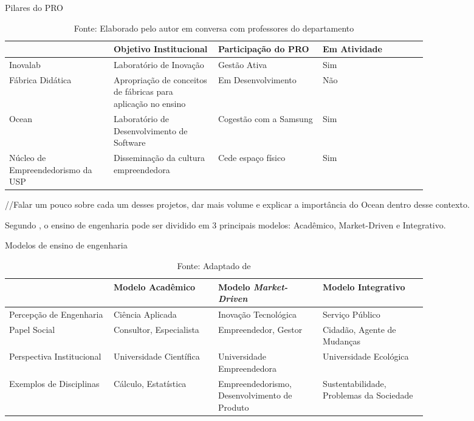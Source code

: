 \begin{table}[H]
\begin{center}
\caption{Pilares do PRO}
\label{tab:pilares_pro}
{\def\arraystretch{2}\tabcolsep=10pt
\begin{tabular}{>{\raggedright}p{0.2\linewidth}>{\raggedright\arraybackslash}p{0.2\linewidth}>{\raggedright\arraybackslash}p{0.2\linewidth}>{\raggedright\arraybackslash}p{0.2\linewidth}}
\hline
     & Objetivo Institucional & Participação do PRO & Em Atividade  \\ \hline
     Inovalab & Laboratório de Inovação & Gestão Ativa & Sim  \\
     Fábrica Didática & Apropriação de conceitos de fábricas para aplicação no ensino & Em Desenvolvimento & Não \\
     Ocean & Laboratório de Desenvolvimento de Software & Cogestão com a Samsung & Sim \\
	 Núcleo de Empreendedorismo da USP & Disseminação da cultura empreendedora & Cede espaço físico & Sim \\ \hline
\end{tabular}%
}
\caption* {Fonte: Elaborado pelo autor em conversa com professores do departamento}
\end{center}
\end{table}

//Falar um pouco sobre cada um desses projetos, dar mais volume e explicar a importância do Ocean dentro desse contexto. 


Segundo , o ensino de engenharia pode ser dividido em 3 principais modelos: Acadêmico, Market-Driven e Integrativo.

\begin{table}[H]
\begin{center}
\caption{Modelos de ensino de engenharia}
\label{tab:modelos_ensino_tab}
{\def\arraystretch{2}\tabcolsep=10pt
\begin{tabular}{>{\raggedright}p{0.2\linewidth}>{\raggedright\arraybackslash}p{0.2\linewidth}>{\raggedright\arraybackslash}p{0.2\linewidth}>{\raggedright\arraybackslash}p{0.2\linewidth}}
\hline
     & Modelo Acadêmico & Modelo \textit{Market-Driven} & Modelo Integrativo \\ \hline
     Percepção de Engenharia & Ciência Aplicada & Inovação Tecnológica & Serviço Público \\
     Papel Social & Consultor, Especialista & Empreendedor, Gestor & Cidadão, Agente de Mudanças \\
     Perspectiva Institucional & Universidade Científica & Universidade Empreendedora & Universidade Ecológica  \\
	 Exemplos de Disciplinas & Cálculo, Estatística & Empreendedorismo, Desenvolvimento de Produto & Sustentabilidade, Problemas da Sociedade \\ \hline
\end{tabular}%
}
\caption* {Fonte: Adaptado de }
\end{center}
\end{table}

